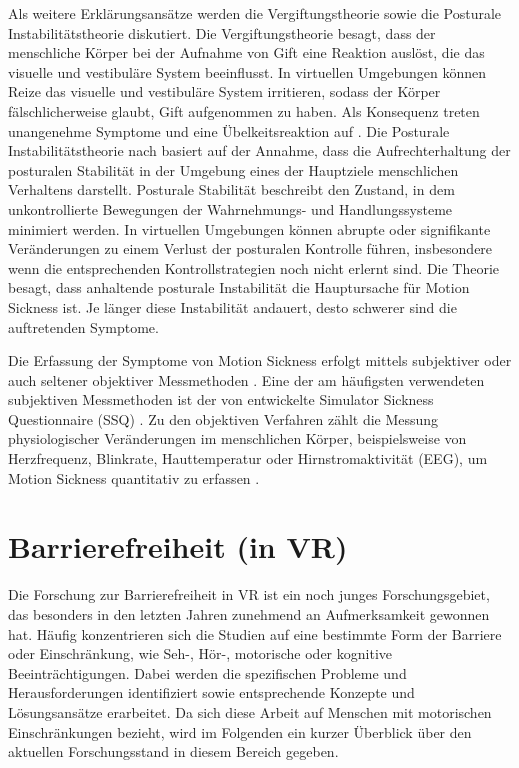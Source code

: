 Als weitere Erklärungsansätze werden die Vergiftungstheorie sowie die Posturale Instabilitätstheorie diskutiert. Die Vergiftungstheorie besagt, dass der menschliche Körper bei der Aufnahme von Gift eine Reaktion auslöst, die das visuelle und vestibuläre System beeinflusst. In virtuellen Umgebungen können Reize das visuelle und vestibuläre System irritieren, sodass der Körper fälschlicherweise glaubt, Gift aufgenommen zu haben. Als Konsequenz treten unangenehme Symptome und eine Übelkeitsreaktion auf \citep{laviola_discussion_2000}. Die Posturale Instabilitätstheorie nach \citet{riccio_ecological_1991} basiert auf der Annahme, dass die Aufrechterhaltung der posturalen Stabilität in der Umgebung eines der Hauptziele menschlichen Verhaltens darstellt. Posturale Stabilität beschreibt den Zustand, in dem unkontrollierte Bewegungen der Wahrnehmungs- und Handlungssysteme minimiert werden. In virtuellen Umgebungen können abrupte oder signifikante Veränderungen zu einem Verlust der posturalen Kontrolle führen, insbesondere wenn die entsprechenden Kontrollstrategien noch nicht erlernt sind. Die Theorie besagt, dass anhaltende posturale Instabilität die Hauptursache für Motion Sickness ist. Je länger diese Instabilität andauert, desto schwerer sind die auftretenden Symptome.

Die Erfassung der Symptome von Motion Sickness erfolgt mittels subjektiver oder auch seltener objektiver Messmethoden \citep{somrak_estimating_2019}. Eine der am häufigsten verwendeten subjektiven Messmethoden ist der von \citet{kennedy_simulator_1993} entwickelte Simulator Sickness Questionnaire (SSQ) . Zu den objektiven Verfahren zählt die Messung physiologischer Veränderungen im menschlichen Körper, beispielsweise von Herzfrequenz, Blinkrate, Hauttemperatur oder Hirnstromaktivität (EEG), um Motion Sickness quantitativ zu erfassen \citep{somrak_estimating_2019}. 

\section{Barrierefreiheit (in VR)} 

Die Forschung zur Barrierefreiheit in VR ist ein noch junges Forschungsgebiet, das besonders in den letzten Jahren zunehmend an Aufmerksamkeit gewonnen hat. Häufig konzentrieren sich die Studien auf eine bestimmte Form der Barriere oder Einschränkung, wie Seh-, Hör-, motorische oder kognitive Beeinträchtigungen. Dabei werden die spezifischen Probleme und Herausforderungen identifiziert sowie entsprechende Konzepte und Lösungsansätze erarbeitet. Da sich diese Arbeit auf Menschen mit motorischen Einschränkungen bezieht, wird im Folgenden ein kurzer Überblick über den aktuellen Forschungsstand in diesem Bereich gegeben. 

